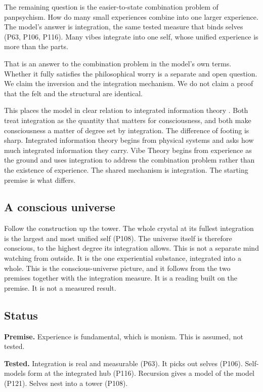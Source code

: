 The remaining question is the easier-to-state combination problem of panpsychism. How do many small experiences combine into one larger experience. The model's answer is integration, the same tested measure that binds selves (P63, P106, P116). Many vibes integrate into one self, whose unified experience is more than the parts.

That is an answer to the combination problem in the model's own terms. Whether it fully satisfies the philosophical worry is a separate and open question. We claim the inversion and the integration mechanism. We do not claim a proof that the felt and the structural are identical.

This places the model in clear relation to integrated information theory \cite{tononi2004}. Both treat integration as the quantity that matters for consciousness, and both make consciousness a matter of degree set by integration. The difference of footing is sharp. Integrated information theory begins from physical systems and asks how much integrated information they carry. Vibe Theory begins from experience as the ground and uses integration to address the combination problem rather than the existence of experience. The shared mechanism is integration. The starting premise is what differs.

\subsection{A conscious universe}

Follow the construction up the tower. The whole crystal at its fullest integration is the largest and most unified self (P108). The universe itself is therefore conscious, to the highest degree its integration allows. This is not a separate mind watching from outside. It is the one experiential substance, integrated into a whole. This is the conscious-universe picture, and it follows from the two premises together with the integration measure. It is a reading built on the premise. It is not a measured result.

\subsection{Status}

\textbf{Premise.} Experience is fundamental, which is monism. This is assumed, not tested.

\textbf{Tested.} Integration is real and measurable (P63). It picks out selves (P106). Self-models form at the integrated hub (P116). Recursion gives a model of the model (P121). Selves nest into a tower (P108).

